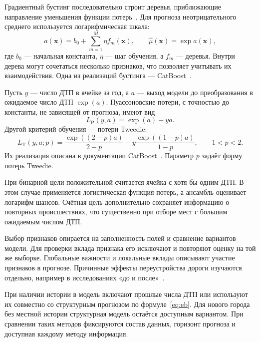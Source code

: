 \documentclass[coursework]{SCWorks}
\begin{document}
Градиентный бустинг последовательно строит деревья, приближающие
направление уменьшения функции потерь~\cite{friedman2001}. Для прогноза
неотрицательного среднего используется логарифмическая шкала:
\begin{equation}
  a(\mathbf{x})=b_0+\sum_{m=1}^{M}\eta f_m(\mathbf{x}),\qquad
  \widehat\mu(\mathbf{x})=\exp a(\mathbf{x}),
  \label{eq:gbdt}
\end{equation}
где $b_0$ --- начальная константа, $\eta$ --- шаг обучения, а $f_m$ ---
деревья. Внутри дерева могут сочетаться несколько признаков,
что позволяет учитывать их взаимодействия. Одна из реализаций
бустинга --- CatBoost~\cite{catboost2018}.

Пусть $y$ --- число ДТП в ячейке за год, а $a$ --- выход модели
до преобразования в ожидаемое число ДТП $\exp(a)$.
Пуассоновские потери, с точностью до константы, не зависящей
от прогноза, имеют вид
\begin{equation}
  L_{\mathrm{P}}(y,a)=\exp(a)-ya.
  \label{eq:poisson_loss}
\end{equation}
Другой критерий обучения --- потери Tweedie:
\begin{equation}
  L_{\mathrm{T}}(y,a;p)=
  \frac{\exp((2-p)a)}{2-p}
  -y\frac{\exp((1-p)a)}{1-p},\qquad 1<p<2.
  \label{eq:tweedie_loss}
\end{equation}
Их реализация описана в документации CatBoost~\cite{catboostlosses}.
Параметр $p$ задаёт форму потерь Tweedie.

При бинарной цели положительной считается ячейка с хотя бы одним
ДТП. В этом случае применяется логистическая функция потерь,
а ансамбль оценивает логарифм шансов. Счётная цель дополнительно
сохраняет информацию о повторных происшествиях, что существенно
при отборе мест с большим ожидаемым числом ДТП.

Выбор признаков опирается на заполненность полей и сравнение
вариантов модели. Для проверки вклада признака его исключают
и повторяют оценку на той же выборке. Глобальные важности
и локальные вклады описывают участие признаков в прогнозе.
Причинные эффекты переустройства дороги изучаются отдельно,
например в исследованиях «до и после»~\cite{hauer1997}.

При наличии истории в модель включают прошлые числа ДТП или
используют их совместно со структурным прогнозом по
формуле~\eqref{eq:eb}. Для нового города без местной истории
структурная модель остаётся доступным вариантом. При сравнении
таких методов фиксируются состав данных, горизонт прогноза
и доступная каждому методу информация.
\end{document}
